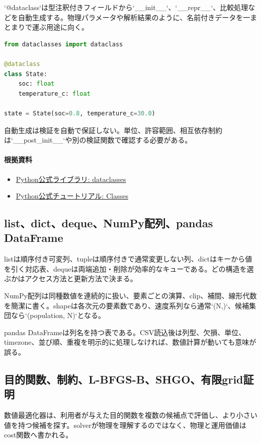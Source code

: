 \documentclass[a4paper,11pt]{article}
\begin{document}
`@dataclass`は型注釈付きフィールドから`\_\_init\_\_`、`\_\_repr\_\_`、比較処理などを自動生成する。物理パラメータや解析結果のように、名前付きデータを一まとまりで運ぶ用途に向く。


\begin{lstlisting}[language=python]
from dataclasses import dataclass

@dataclass
class State:
    soc: float
    temperature_c: float

state = State(soc=0.8, temperature_c=30.0)
\end{lstlisting}


自動生成は検証を自動で保証しない。単位、許容範囲、相互依存制約は`\_\_post\_init\_\_`や別の検証関数で確認する必要がある。

\paragraph{根拠資料}
\begin{itemize}[leftmargin=1.6em]
\item \href{https://docs.python.org/3/library/dataclasses.html}{Python公式ライブラリ: dataclasses}
\item \href{https://docs.python.org/3/tutorial/classes.html}{Python公式チュートリアル: Classes}
\end{itemize}

\subsection{list、dict、deque、NumPy配列、pandas DataFrame}
listは順序付き可変列、tupleは順序付きで通常変更しない列、dictはキーから値を引く対応表、dequeは両端追加・削除が効率的なキューである。どの構造を選ぶかはアクセス方法と更新方法で決まる。


NumPy配列は同種数値を連続的に扱い、要素ごとの演算、clip、補間、線形代数を簡潔に書く。shapeは各次元の要素数であり、速度系列なら通常`(N,)`、候補集団なら`(population, N)`となる。


pandas DataFrameは列名を持つ表である。CSV読込後は列型、欠損、単位、timezone、並び順、重複を明示的に処理しなければ、数値計算が動いても意味が誤る。



\subsection{目的関数、制約、L-BFGS-B、SHGO、有限grid証明}
数値最適化器は、利用者が与えた目的関数を複数の候補点で評価し、より小さい値を持つ候補を探す。solverが物理を理解するのではなく、物理と運用価値はcost関数へ書かれる。
\end{document}
